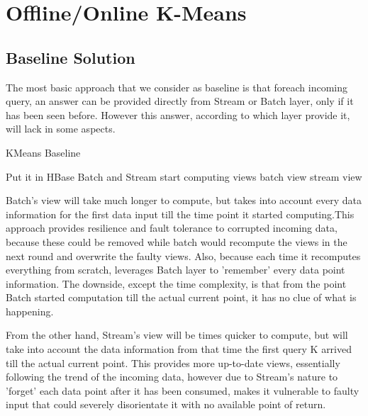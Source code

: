 \documentclass{lmproj}
\begin{document}
\chapter{Offline/Online K-Means}
\label{kmeans}

\section{Baseline Solution}
\label{kmeans}

The most basic approach that we consider as baseline is that foreach incoming query, an answer can be provided directly from Stream or Batch layer, only if it has been seen before. However this answer, according to which layer provide it, will lack in some aspects.

\bigskip
\begin{algorithm}[H]
	\caption{KMeans Baseline}\label{kmeansbaseline}
	\begin{algorithmic}[1]
		
		\State Put it in HBase
		\State Batch and Stream start computing views
		\Else 
		\State \Return batch view
		\State \Return stream view
		\EndIf
		\EndIf			
		
		\EndProcedure
	\end{algorithmic}
\end{algorithm}

Batch's view will take much longer to compute, but takes into account every data information for the first data input till the time point it started computing.This approach provides resilience and fault tolerance to corrupted incoming data, because these could be removed while batch would recompute the views in the next round and overwrite the faulty views. Also, because each time it recomputes everything from scratch, leverages Batch layer to 'remember' every data point information. The downside, except the time complexity, is that from the point Batch started computation till the actual current point, it has no clue of what is happening. 

From the other hand, Stream's view will be times quicker to compute, but will take into account the data information from that time the first query K arrived till the actual current point. This provides more up-to-date views, essentially following the trend of the incoming data, however due to Stream's nature to 'forget' each data point after it has been consumed, makes it vulnerable to faulty input that could severely disorientate it with no available point of return.
\end{document}
